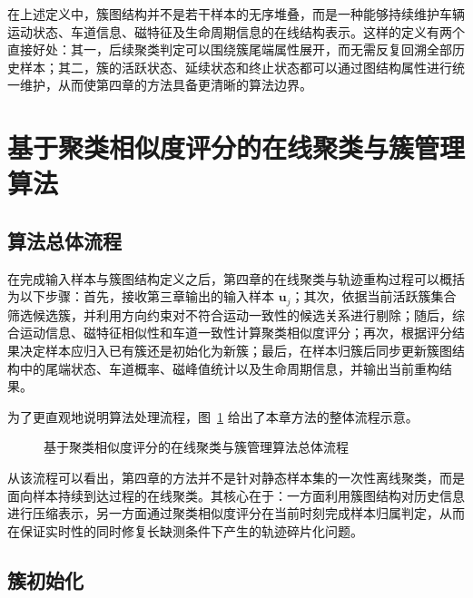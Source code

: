 \documentclass{xdupgthesis}
\begin{document}
在上述定义中，簇图结构并不是若干样本的无序堆叠，而是一种能够持续维护车辆运动状态、车道信息、磁特征及生命周期信息的在线结构表示。这样的定义有两个直接好处：其一，后续聚类判定可以围绕簇尾端属性展开，而无需反复回溯全部历史样本；其二，簇的活跃状态、延续状态和终止状态都可以通过图结构属性进行统一维护，从而使第四章的方法具备更清晰的算法边界。

\section{基于聚类相似度评分的在线聚类与簇管理算法}

\subsection{算法总体流程}

在完成输入样本与簇图结构定义之后，第四章的在线聚类与轨迹重构过程可以概括为以下步骤：首先，接收第三章输出的输入样本 $\mathbf{u}_j$；其次，依据当前活跃簇集合筛选候选簇，并利用方向约束对不符合运动一致性的候选关系进行剔除；随后，综合运动信息、磁特征相似性和车道一致性计算聚类相似度评分；再次，根据评分结果决定样本应归入已有簇还是初始化为新簇；最后，在样本归簇后同步更新簇图结构中的尾端状态、车道概率、磁峰值统计以及生命周期信息，并输出当前重构结果。

为了更直观地说明算法处理流程，图~\ref{fig:4_1_algorithm_flow} 给出了本章方法的整体流程示意。

\begin{figure}[H]
	\centering
	\caption{基于聚类相似度评分的在线聚类与簇管理算法总体流程}
	\label{fig:4_1_algorithm_flow}
\end{figure}

从该流程可以看出，第四章的方法并不是针对静态样本集的一次性离线聚类，而是面向样本持续到达过程的在线聚类。其核心在于：一方面利用簇图结构对历史信息进行压缩表示，另一方面通过聚类相似度评分在当前时刻完成样本归属判定，从而在保证实时性的同时修复长缺测条件下产生的轨迹碎片化问题。

\subsection{簇初始化}
\end{document}
